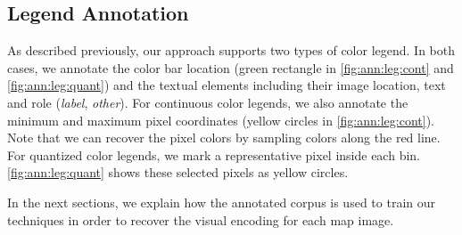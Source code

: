 \figAnnotationsMap


\subsection{Legend Annotation}
\label{subsec:legAnnotation}
As described previously, our approach supports two types of color legend. In both cases, we annotate the color bar location (green rectangle in \autoref{fig:ann:leg:cont} and \autoref{fig:ann:leg:quant}) and the textual elements including their image location, text and role (\ie \emph{label}, \emph{other}).
For continuous color legends, we also annotate the minimum and maximum pixel coordinates (yellow circles in \autoref{fig:ann:leg:cont}). Note that we can recover the pixel colors by sampling colors along the red line. 
For quantized color legends, we mark a representative pixel inside each bin. \autoref{fig:ann:leg:quant} shows these selected pixels as yellow circles. 

\figAnnotationsLegend

In the next sections, we explain how the annotated corpus is used to train our techniques in order to recover the visual encoding for each map image.
